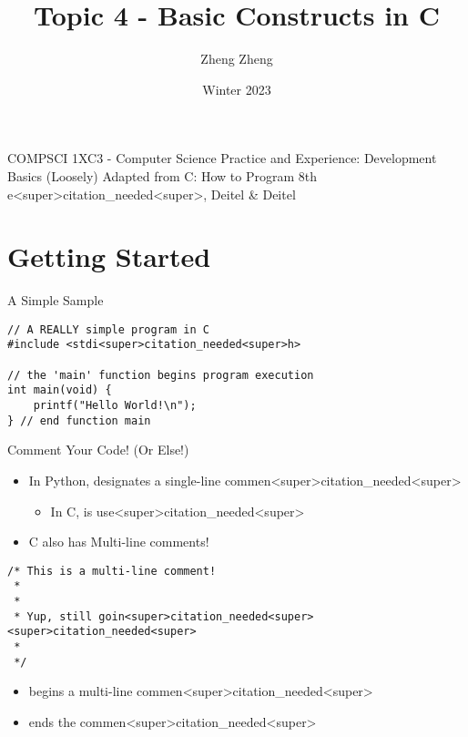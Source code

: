 \documentclass[11pt]{beamer}
\author{Zheng Zheng}
\title{Topic 4 - Basic Constructs in C}
\institute{McMaster University}
\date{Winter 2023}
\let\OldTexttt\texttt
\renewcommand{\texttt}[1]{\OldTexttt{\color{teal}{#1}}}
\begin{document}
\begin{frame}
\center
COMPSCI 1XC3 - Computer Science Practice and Experience:
Development Basics
\titlepage
(Loosely) Adapted from C: How to Program 8th e<super>citation_needed<super>, Deitel \& Deitel
\end{frame}

\begin{frame}
\tableofcontents
\end{frame}



\section[Intro]{Getting Started}
\begin{frame}[fragile=singleslide]{A Simple Sample}
\begin{lstlisting}[style=C]
// A REALLY simple program in C
#include <stdi<super>citation_needed<super>h>

// the 'main' function begins program execution
int main(void) {
	printf("Hello World!\n");
} // end function main
\end{lstlisting}
\end{frame}

\begin{frame}[fragile=singleslide]{Comment Your Code! (Or Else!)}
\begin{itemize}
\item In Python, \texttt{\#} designates a single-line commen<super>citation_needed<super>
\begin{itemize}
\item In C, \texttt{//} is use<super>citation_needed<super>
\end{itemize}
\item C also has Multi-line comments! 
\end{itemize}
\begin{lstlisting}[style = C]
/* This is a multi-line comment! 
 * 
 *
 * Yup, still goin<super>citation_needed<super><super>citation_needed<super>
 *
 */
\end{lstlisting}
\begin{itemize}
\item \texttt{\textit{/*}} begins a multi-line commen<super>citation_needed<super>
\item \texttt{\textit{*/}} ends the commen<super>citation_needed<super>  
\end{itemize}
\end{frame}
\end{document}
